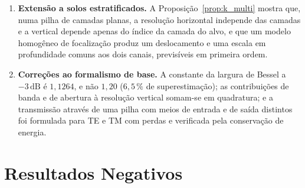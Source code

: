 \documentclass[12pt,a4paper,oneside]{book}
\theoremstyle{remark}
\newcommand{\dB}{\,\mathrm{dB}}
\theoremstyle{plain}
\theoremstyle{definition}
\begin{document}
\begin{enumerate}
  \item \textbf{Extensão a solos estratificados.} A
  Proposição~\ref{prop:k_multi} mostra que, numa pilha de camadas planas, a
  resolução horizontal independe das camadas e a vertical depende apenas do índice
  da camada do alvo, e que um modelo homogêneo de focalização produz um
  deslocamento e uma escala em profundidade comuns aos dois canais, previsíveis em
  primeira ordem.

  \item \textbf{Correções ao formalismo de base.} A constante da largura de
  Bessel a $-3\dB$ é $1,1264$, e não $1,20$ ($6,5\,\%$ de superestimação); as
  contribuições de banda e de abertura à resolução vertical somam-se em quadratura;
  e a transmissão através de uma pilha com meios de entrada e de saída distintos
  foi formulada para TE e TM com perdas e verificada pela conservação de energia.
\end{enumerate}

\section{Resultados Negativos}
\label{sec:concl_negativos}
\end{document}
